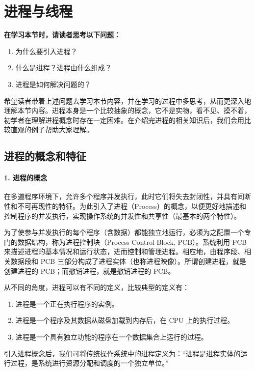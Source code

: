 \documentclass{ctexbook}
\begin{document}
	\section{进程与线程}
	
	\textbf{在学习本节时，请读者思考以下问题：}
	
	\begin{enumerate}
		\item 为什么要引入进程？
		\item 什么是进程？进程由什么组成？
		\item 进程是如何解决问题的？
	\end{enumerate}
	
	希望读者带着上述问题去学习本节内容，并在学习的过程中多思考，从而更深入地理解本节内容。进程本身是一个比较抽象的概念，它不是实物，看不见、摸不着，初学者在理解进程概念时存在一定困难。在介绍完进程的相关知识后，我们会用比较直观的例子帮助大家理解。
	
	\subsection{进程的概念和特征}
	
	\paragraph{1. 进程的概念}
	
	在多道程序环境下，允许多个程序并发执行，此时它们将失去封闭性，并具有间断性和不可再现性的特征。为此引入了进程（Process）的概念，以便更好地描述和控制程序的并发执行，实现操作系统的并发性和共享性（最基本的两个特性）。
	
	为了使参与并发执行的每个程序（含数据）都能独立地运行，必须为之配置一个专门的数据结构，称为进程控制块（Process Control Block, PCB）。系统利用 PCB 来描述进程的基本情况和运行状态，进而控制和管理进程。相应地，由程序段、相关数据段和 PCB 三部分构成了进程实体（也称进程映像）。所谓创建进程，就是创建进程的 PCB；而撤销进程，就是撤销进程的 PCB。
	
	从不同的角度，进程可以有不同的定义，比较典型的定义有：
	\begin{enumerate}
		\item 进程是一个正在执行程序的实例。
		\item 进程是一个程序及其数据从磁盘加载到内存后，在 CPU 上的执行过程。
		\item 进程是一个具有独立功能的程序在一个数据集合上运行的过程。
	\end{enumerate}
	
	引入进程概念后，我们可将传统操作系统中的进程定义为：“进程是进程实体的运行过程，是系统进行资源分配和调度的一个独立单位。”
	
\end{document}
